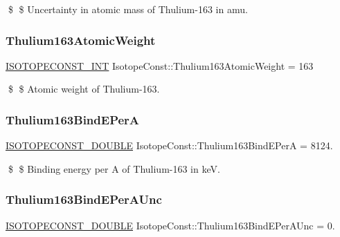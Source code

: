 \$ \$ Uncertainty in atomic mass of Thulium-\/163 in amu. \mbox{\label{group___isotope_const-_thulium-_tm163_ga7954ef1157272f9b001a13c6d2500446}} 
\subsubsection{\texorpdfstring{Thulium163\+Atomic\+Weight}{Thulium163AtomicWeight}}
{\footnotesize\ttfamily \mbox{\hyperlink{group___isotope_const-_macros_ga5f18360b3e99483a35c32d789e62621c}{I\+S\+O\+T\+O\+P\+E\+C\+O\+N\+S\+T\+\_\+\+I\+NT}} Isotope\+Const\+::\+Thulium163\+Atomic\+Weight = 163}

\$ \$ Atomic weight of Thulium-\/163. \mbox{\label{group___isotope_const-_thulium-_tm163_gae90ce3c893a9b59b315bad84cc29c435}} 
\subsubsection{\texorpdfstring{Thulium163\+Bind\+E\+PerA}{Thulium163BindEPerA}}
{\footnotesize\ttfamily \mbox{\hyperlink{group___isotope_const-_macros_ga8f45a7272ce02c0b4c65c44636ed719a}{I\+S\+O\+T\+O\+P\+E\+C\+O\+N\+S\+T\+\_\+\+D\+O\+U\+B\+LE}} Isotope\+Const\+::\+Thulium163\+Bind\+E\+PerA = 8124.}

\$ \$ Binding energy per A of Thulium-\/163 in keV. \mbox{\label{group___isotope_const-_thulium-_tm163_ga044c9bde67b80d5553bc0648ccfc8ba4}} 
\subsubsection{\texorpdfstring{Thulium163\+Bind\+E\+Per\+A\+Unc}{Thulium163BindEPerAUnc}}
{\footnotesize\ttfamily \mbox{\hyperlink{group___isotope_const-_macros_ga8f45a7272ce02c0b4c65c44636ed719a}{I\+S\+O\+T\+O\+P\+E\+C\+O\+N\+S\+T\+\_\+\+D\+O\+U\+B\+LE}} Isotope\+Const\+::\+Thulium163\+Bind\+E\+Per\+A\+Unc = 0.}

